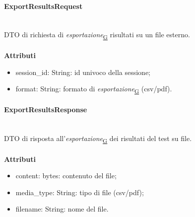 \documentclass[a4paper,12pt]{article}
\begin{document}
                \paragraph{ExportResultsRequest}\mbox{}\\
                    DTO di richiesta di \textit{esportazione}\textsubscript{\href{https://atlasteam9.github.io/Atlas/glossario.html\#Esportazione}{G}} risultati su un file esterno.\\\\
                    \textbf{Attributi}
                    \begin{itemize}
                        \item {\ttfamily session\_id: String}: id univoco della sessione;
                        \item {\ttfamily format: String}: formato di \textit{esportazione}\textsubscript{\href{https://atlasteam9.github.io/Atlas/glossario.html\#Esportazione}{G}} (csv/pdf).
                    \end{itemize}

                \paragraph{ExportResultsResponse}\mbox{}\\
                    DTO di risposta all'\textit{esportazione}\textsubscript{\href{https://atlasteam9.github.io/Atlas/glossario.html\#Esportazione}{G}} dei risultati del test su file.\\\\
                    \textbf{Attributi}
                    \begin{itemize}
                        \item {\ttfamily content: bytes}: contenuto del file;
                        \item {\ttfamily media\_type: String}: tipo di file (csv/pdf);
                        \item {\ttfamily filename: String}: nome del file.
                    \end{itemize}
\end{document}
